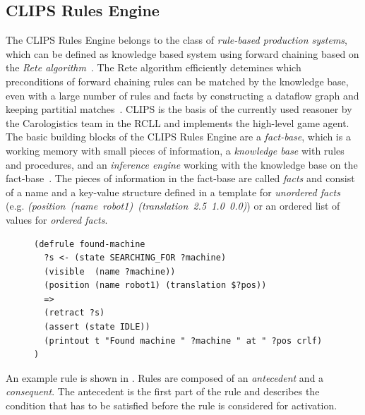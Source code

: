 \subsection{CLIPS Rules Engine}
The CLIPS Rules Engine belongs to the class of \emph{rule-based
  production systems}, which can be defined as knowledge based system
using forward chaining based on the \emph{Rete
  algorithm}~\cite{aimodern}. The Rete algorithm efficiently detemines
which preconditions of forward chaining rules can be matched by the
knowledge base, even with a large number of rules and facts by
constructing a dataflow graph and keeping partitial
matches~\cite{Rete}. CLIPS is the basis of the currently used reasoner
by the Carologistics team in the RCLL and implements the high-level
game agent. The basic building blocks of the CLIPS Rules Engine are a
\emph{fact-base}, which is a working memory with small pieces of
information, a \emph{knowledge base} with rules and procedures, and an
\emph{inference engine} working with the knowledge base on the
fact-base~\cite{CLIPS-RM}. The pieces of information in the fact-base
are called \emph{facts} and consist of a name and a key-value
structure defined in a template for \emph{unordered facts}
(e.g. \emph{(position~(name~robot1)~(translation~2.5~1.0~0.0)}) or an
ordered list of values for \emph{ordered facts}.
\begin{figure}
\begin{lstlisting}[showlines,style=ReallySmallCLIPS, caption={CLIPS
    rule to change a robots state when the object it searched for is visible.},
  label=lst:clips-rule,
  emph={skill, args, state, target, res},
  emphstyle=\bfseries\color{green!80!black},
  emph={[2]\?skill, \$\?args, wait-for-lock, \?target, use,
  WAIT-FOR-LOCK, SKILL-EXECUTION, running},
  emphstyle={[2]\bfseries\color{blue!80!black}},
  morekeywords={retract, assert, modify, skill-call, skill-to-execute,
  wait-for-lock}]
(defrule found-machine
  ?s <- (state SEARCHING_FOR ?machine)
  (visible  (name ?machine))
  (position (name robot1) (translation $?pos))
  =>  
  (retract ?s) 
  (assert (state IDLE))
  (printout t "Found machine " ?machine " at " ?pos crlf)
)
\end{lstlisting} %
\end{figure}
An example rule is shown in . Rules are
composed of an \emph{antecedent} and a \emph{consequent}. The
antecedent is the first part of the rule and describes the condition
that has to be satisfied before the rule is considered for activation.
